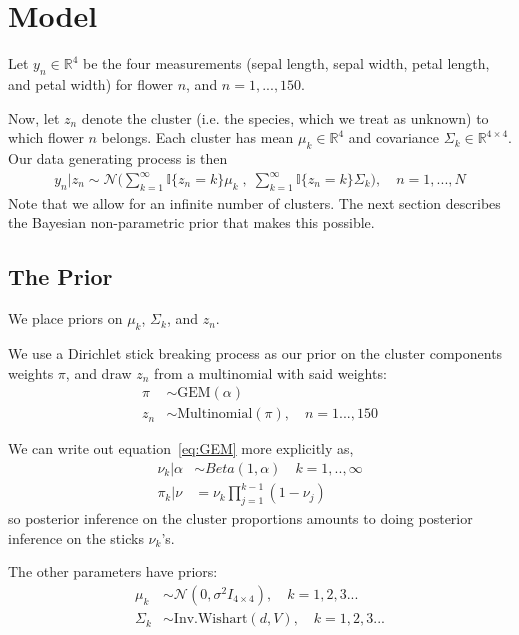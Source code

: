 \documentclass[a4paper]{article}
\begin{document}
\section{Model}
Let $y_{n}\in \mathbb{R}^4$ be the four measurements
(sepal length, sepal width, petal length, and petal width)
for flower $n$, and $n = 1, ..., 150$.

Now, let $z_n$ denote the cluster (i.e. the species, which we treat as unknown)
to which flower $n$ belongs.
Each cluster has mean $\mu_k\in \mathbb{R}^4$  and covariance $\Sigma_k \in \mathbb{R}^{4\times 4}$.
Our data generating process is then
\begin{align}
	y_n | z_n \sim \mathcal{N}\Big(\sum_{k=1}^\infty \mathbb{I}\{z_n = k\} \mu_k \;,
              \; \sum_{k=1}^\infty \mathbb{I}\{z_n = k\} \Sigma_k\Big),
	\quad n = 1, ..., N
\end{align}
Note that we allow for an infinite number of clusters. The next section describes
the Bayesian non-parametric prior that makes this possible.

\subsection{The Prior}
We place priors on $\mu_k$, $\Sigma_k$, and $z_n$. \par

We use a Dirichlet stick breaking process \cite{dp_prior} as our prior on the cluster components
weights $\pi$, and draw $z_n$ from a multinomial with said weights:
\begin{align}
	\pi &\sim \text{GEM}(\alpha) \label{eq:GEM} \\
	 z_n &\sim \text{Multinomial}(\pi), \quad n = 1..., 150
\end{align}

We can write out equation~\ref{eq:GEM} more explicitly as,
\begin{align}
  \nu_k | \alpha &\sim Beta(1, \alpha) \quad k = 1, .., \infty \label{eq:beta_sticks}\\
  \pi_k | \nu &= \nu_k \prod_{j=1}^{k-1} (1 - \nu_j) \label{eq:stick_breaking}
\end{align}
so posterior inference on the cluster proportions amounts to doing
posterior inference on the sticks $\nu_k$'s.

The other parameters have priors:
\begin{align}
	\mu_k &\sim \mathcal{N}(0, \sigma^2 I_{4\times 4}), \quad k = 1, 2, 3 ... \\
	\Sigma_k &\sim \text{Inv.Wishart}(d, V), \quad k = 1, 2, 3 ...
\end{align}
\end{document}
